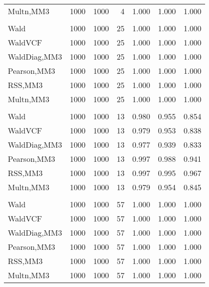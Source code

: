 \documentclass[
]{article}
\begin{document}
\begin{table}[H]
{\begin{tabular}[t]{lrrrrrr}
\hspace{1em}Multn,MM3 & 1000 & 1000 & 4 & 1.000 & 1.000 & 1.000\\
\addlinespace[0.3em]
\multicolumn{7}{l}{\textbf{1F 15V}}\\
\hspace{1em}Wald & 1000 & 1000 & 25 & 1.000 & 1.000 & 1.000\\
\hspace{1em}WaldVCF & 1000 & 1000 & 25 & 1.000 & 1.000 & 1.000\\
\hspace{1em}WaldDiag,MM3 & 1000 & 1000 & 25 & 1.000 & 1.000 & 1.000\\
\hspace{1em}Pearson,MM3 & 1000 & 1000 & 25 & 1.000 & 1.000 & 1.000\\
\hspace{1em}RSS,MM3 & 1000 & 1000 & 25 & 1.000 & 1.000 & 1.000\\
\hspace{1em}Multn,MM3 & 1000 & 1000 & 25 & 1.000 & 1.000 & 1.000\\
\addlinespace[0.3em]
\multicolumn{7}{l}{\textbf{2F 10V}}\\
\hspace{1em}Wald & 1000 & 1000 & 13 & 0.980 & 0.955 & 0.854\\
\hspace{1em}WaldVCF & 1000 & 1000 & 13 & 0.979 & 0.953 & 0.838\\
\hspace{1em}WaldDiag,MM3 & 1000 & 1000 & 13 & 0.977 & 0.939 & 0.833\\
\hspace{1em}Pearson,MM3 & 1000 & 1000 & 13 & 0.997 & 0.988 & 0.941\\
\hspace{1em}RSS,MM3 & 1000 & 1000 & 13 & 0.997 & 0.995 & 0.967\\
\hspace{1em}Multn,MM3 & 1000 & 1000 & 13 & 0.979 & 0.954 & 0.845\\
\addlinespace[0.3em]
\multicolumn{7}{l}{\textbf{3F 15V}}\\
\hspace{1em}Wald & 1000 & 1000 & 57 & 1.000 & 1.000 & 1.000\\
\hspace{1em}WaldVCF & 1000 & 1000 & 57 & 1.000 & 1.000 & 1.000\\
\hspace{1em}WaldDiag,MM3 & 1000 & 1000 & 57 & 1.000 & 1.000 & 1.000\\
\hspace{1em}Pearson,MM3 & 1000 & 1000 & 57 & 1.000 & 1.000 & 1.000\\
\hspace{1em}RSS,MM3 & 1000 & 1000 & 57 & 1.000 & 1.000 & 1.000\\
\hspace{1em}Multn,MM3 & 1000 & 1000 & 57 & 1.000 & 1.000 & 1.000\\
\bottomrule
\end{tabular}}
\endgroup{}
\end{table}
\end{document}
